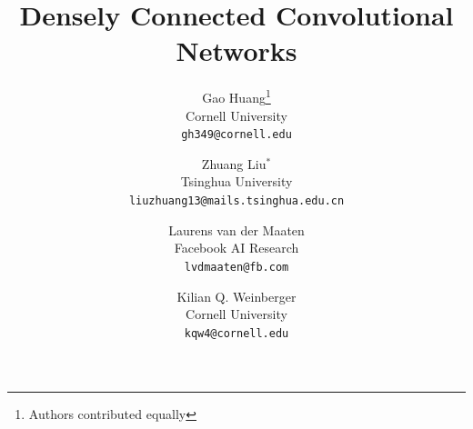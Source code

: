 \documentclass[10pt,twocolumn,letterpaper]{article}
\newif\ifcomments
\begin{document}
\ifcomments
  \newcommand{\comments}[1]{#1}
\else
  \newcommand{\comments}[1]{}
\fi

\newcommand{\name}{Deep Feature Interpolation}
\newcommand{\nameshort}{DFI}

\newcommand{\kqw}[1]{\comments{\textcolor{blue}{[Kilian: #1]}}}

\title{Densely Connected Convolutional Networks}

%

\author{Gao Huang\thanks{Authors contributed equally}\\
Cornell University\\
{\tt\small gh349@cornell.edu}
\and
Zhuang Liu$^*$\\
Tsinghua University\\
{\tt\small liuzhuang13@mails.tsinghua.edu.cn}
\and
Laurens van der Maaten\\
Facebook AI Research\\
{\tt\small lvdmaaten@fb.com}
\and
Kilian Q. Weinberger\\
Cornell University\\
{\tt\small kqw4@cornell.edu}
}
\end{document}
